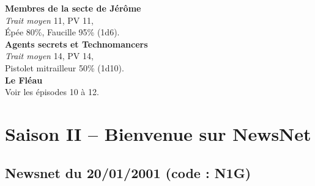 \documentclass[11pt,twoside,a4paper]{book}
\begin{document}
\textbf{Membres de la secte de J{\'e}r{\^o}me}~\\
\emph{Trait moyen} 11, PV 11,~\\
{\'E}p{\'e}e 80\%, Faucille 95\% (1d6).~\\

\textbf{Agents secrets et Technomancers}~\\
\emph{Trait moyen} 14, PV 14,~\\
Pistolet mitrailleur 50\% (1d10).~\\

\textbf{Le Fl{\'e}au}~\\
Voir les {\'e}pisodes 10 {\`a} 12.~\\


\clearpage

\chapter*{Saison II -- Bienvenue sur NewsNet}

\section*{Newsnet du 20/01/2001 (code : N1G)}
\end{document}
